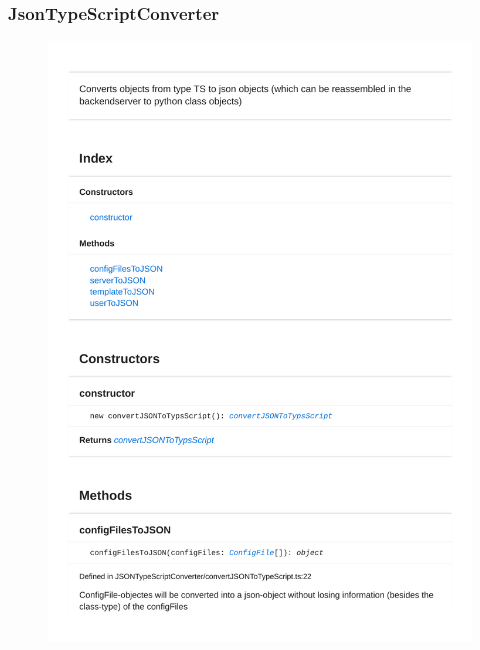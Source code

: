\subsubsection{JsonTypeScriptConverter}
\begin{figure}[H]
\centerline{\includegraphics[width=1\textwidth]{FrontendDocsAsPDF/JSONTypeSriptConverter/convertJSONToTypeScript.pdf}}
\end{figure}

